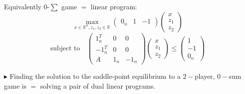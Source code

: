 \documentclass[../Main.tex]{subfiles}
\begin{document}
{Equivalently $0$-$\sum$ game $=$ linear program:
\[
    \max_{x \in \mathbb{R}^n, z_1, z_2 \in \mathbb{R}} \begin{pmatrix} 0_n & 1 & -1 \end{pmatrix} \begin{pmatrix} x \\ z_1 \\ z_2 \end{pmatrix}
\]
\[
    \text{subject to} \quad
    \begin{pmatrix} 1_n^T & 0 & 0 \\ -1_n^T & 0 & 0 \\ A & 1_n & -1_n \end{pmatrix}
    \begin{pmatrix} x \\ z_1 \\ z_2 \end{pmatrix}
    \le
    \begin{pmatrix} 1 \\ -1 \\ 0_n \end{pmatrix}
\]
}

$\blacktriangleright$ Finding the solution to the saddle-point equilibrium to a $2-$player, $0-$sum game is $=$ solving a pair of dual linear programs.\\
\end{document}
